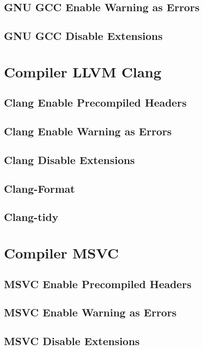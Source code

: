 \documentclass[openany]{report}
\begin{document}
\subsection{GNU GCC Enable Warning as Errors}
\subsection{GNU GCC Disable Extensions}


\section{Compiler LLVM Clang}

\subsection{Clang Enable Precompiled Headers}
\subsection{Clang Enable Warning as Errors}
\subsection{Clang Disable Extensions}

\subsection{Clang-Format}

\subsection{Clang-tidy}


\section{Compiler MSVC}

\subsection{MSVC Enable Precompiled Headers}
\subsection{MSVC Enable Warning as Errors}
\subsection{MSVC Disable Extensions}
\end{document}

